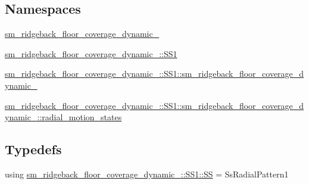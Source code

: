 \subsection*{Namespaces}
\begin{DoxyCompactItemize}
\item 
 \hyperlink{namespacesm__ridgeback__floor__coverage__dynamic__1}{sm\+\_\+ridgeback\+\_\+floor\+\_\+coverage\+\_\+dynamic\+\_}
\item 
 \hyperlink{namespacesm__ridgeback__floor__coverage__dynamic__1_1_1SS1}{sm\+\_\+ridgeback\+\_\+floor\+\_\+coverage\+\_\+dynamic\+\_\+::\+S\+S1}
\item 
 \hyperlink{namespacesm__ridgeback__floor__coverage__dynamic__1_1_1SS1_1_1sm__ridgeback__floor__coverage__dynamic__1}{sm\+\_\+ridgeback\+\_\+floor\+\_\+coverage\+\_\+dynamic\+\_\+::\+S\+S1\+::sm\+\_\+ridgeback\+\_\+floor\+\_\+coverage\+\_\+dynamic\+\_}
\item 
 \hyperlink{namespacesm__ridgeback__floor__coverage__dynamic__1_1_1SS1_1_1sm__ridgeback__floor__coverage__dy8a0be66cafdbe893e97ae1235d652522}{sm\+\_\+ridgeback\+\_\+floor\+\_\+coverage\+\_\+dynamic\+\_\+::\+S\+S1\+::sm\+\_\+ridgeback\+\_\+floor\+\_\+coverage\+\_\+dynamic\+\_\+::radial\+\_\+motion\+\_\+states}
\end{DoxyCompactItemize}
\subsection*{Typedefs}
\begin{DoxyCompactItemize}
\item 
using \hyperlink{namespacesm__ridgeback__floor__coverage__dynamic__1_1_1SS1_ab7908a02f2d8b027694a0e185b770dac}{sm\+\_\+ridgeback\+\_\+floor\+\_\+coverage\+\_\+dynamic\+\_\+::\+S\+S1\+::\+SS} = Ss\+Radial\+Pattern1
\end{DoxyCompactItemize}
